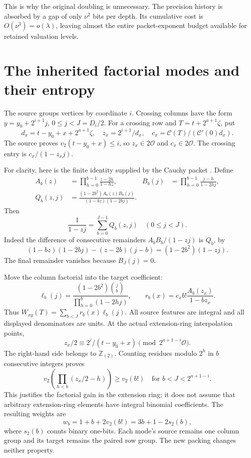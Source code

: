\documentclass[11pt]{article}
\theoremstyle{remark}\newtheorem{remark}[theorem]{Remark}
\newcommand{\vTwo}{v_2}
\newcommand{\OO}{\mathcal O}
\newcommand{\Zloc}{\mathbb Z_{(2)}}
\begin{document}
This is why the original doubling is unnecessary. The precision history is absorbed by a gap of only $\nu^2$ bits per depth. Its cumulative cost is $O(\nu^3)=o(\lambda)$, leaving almost the entire packet-exponent budget available for retained valuation levels.

\section{The inherited factorial modes and their entropy}
\label{sec:modes}

The source groups vertices by coordinate $i$. Crossing columns have the form $y=y_0+2^{i+1}j$, $0\le j<J=D_i/2$. For a crossing row and $T=t+2^{a+1}\zeta$, put
\[
 d_x=t-y_0+x+2^{a+1}\zeta,\quad
 z_x=2^{i+1}/d_x,\quad
 c_x=\mathcal C(T)/(\mathcal C'(0)d_x).
\]
The source proves $\vTwo(t-y_0+x)\le i$, so $z_x\in2\OO$ and $c_x\in2\OO$. The crossing entry is $c_x/(1-z_xj)$.

For clarity, here is the finite identity supplied by the Cauchy packet \cite{cauchy}. Define
\begin{align*}
 A_b(z)&=\prod_{h=0}^{b-1}\frac{z-2h}{1-hz},&
 B_b(j)&=\prod_{h=0}^{b-1}\frac{j-h}{1-2hj},\\
 Q_b(z,j)&=\frac{(1-2b^2)A_b(z)B_b(j)}{(1-bz)(1-2bj)}.
\end{align*}
Then
\[
 \frac1{1-zj}=\sum_{b=0}^{J-1}Q_b(z,j)\quad(0\le j<J).
\]
Indeed the difference of consecutive remainders $A_bB_b/(1-zj)$ is $Q_b$, by
\[
 (1-bz)(1-2bj)-(z-2b)(j-b)=(1-2b^2)(1-zj).
\]
The final remainder vanishes because $B_J(j)=0$.

Move the column factorial into the target coefficient:
\[
 \ell_b(j)=\frac{(1-2b^2)\binom jb}{\prod_{h=0}^{b}(1-2hj)},
 \qquad r_b(x)=c_xb!\frac{A_b(z_x)}{1-bz_x}.
\]
Thus $W_{xy}(T)=\sum_{b<J}r_b(x)\ell_b(j)$. All source features are integral and all displayed denominators are units. At the actual extension-ring interpolation points,
\[
 z_x/2\equiv 2^i/(t-y_0+x)\pmod{2^{a+1-i}\OO}.
\]
The right-hand side belongs to $\Zloc$. Counting residues modulo $2^h$ in $b$ consecutive integers proves
\[
 \vTwo\!\left(\prod_{h<b}(z_x/2-h)\right)\ge\vTwo(b!)
 \quad\text{for }b<J<2^{a+1-i}.
\]
This justifies the factorial gain in the extension ring; it does not assume that arbitrary extension-ring elements have integral binomial coefficients. The resulting weights are
\begin{equation}
 w_b=1+b+2\vTwo(b!)=3b+1-2s_2(b),
 \label{eq:weights}
\end{equation}
where $s_2(b)$ counts binary one-bits. Each mode's source remains one column group and its target remains the paired row group. The new packing changes neither property.
\end{document}
